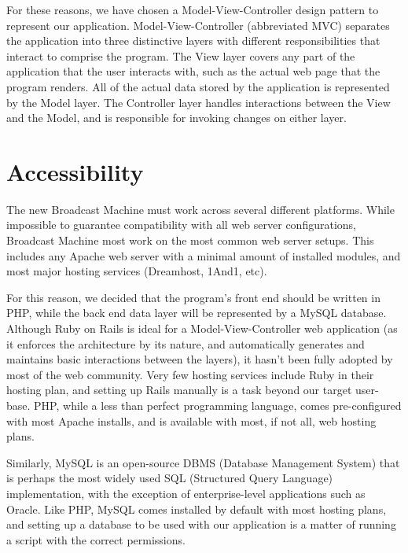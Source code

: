 \documentclass[a4paper,12pt]{report}
\begin{document}
For these reasons, we have chosen a Model-View-Controller design pattern to represent our application. Model-View-Controller (abbreviated MVC) separates the application into three distinctive layers with different responsibilities that interact to comprise the program. The View layer covers any part of the application that the user interacts with, such as the actual web page that the program renders. All of the actual data stored by the application is represented by the Model layer. The Controller layer handles interactions between the View and the Model, and is responsible for invoking changes on either layer.

\section{Accessibility}

The new Broadcast Machine must work across several different platforms. While impossible to guarantee compatibility with all web server configurations, Broadcast Machine most work on the most common web server setups. This includes any Apache web server with a minimal amount of installed modules, and most major hosting services (Dreamhost, 1And1, etc). 

For this reason, we decided that the program’s front end should be written in PHP, while the back end data layer will be represented by a MySQL database. Although Ruby on Rails is ideal for a Model-View-Controller web application (as it enforces the architecture by its nature, and automatically generates and maintains basic interactions between the layers), it hasn’t been fully adopted by most of the web community. Very few hosting services include Ruby in their hosting plan, and setting up Rails manually is a task beyond our target user-base. PHP, while a less than perfect programming language, comes pre-configured with most Apache installs, and is available with most, if not all, web hosting plans. 

Similarly, MySQL is an open-source DBMS (Database Management System) that is perhaps the most widely used SQL (Structured Query Language) implementation, with the exception of enterprise-level applications such as Oracle. Like PHP, MySQL comes installed by default with most hosting plans, and setting up a database to be used with our application is a matter of running a script with the correct permissions. 
\end{document}
